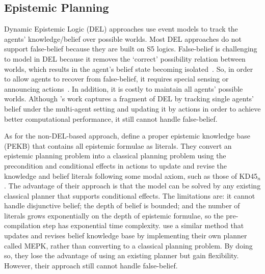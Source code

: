 \subsection{Epistemic Planning}


Dynamic Epistemic Logic (DEL)  approaches use event models to track the agents' knowledge/belief over possible worlds. 
Most DEL approaches do not support false-belief because they are built on S5 logics. 
False-belief is challenging to model in DEL because it removes the `correct' possibility relation between worlds, which results in the agent's belief state becoming isolated~\cite{DBLP:journals/ai/BaralGPS22}.
So, in order to allow agents to recover from false-belief, it requires special sensing or announcing actions~\cite{DBLP:conf/aips/LeFSP18,DBLP:journals/ai/BaralGPS22,DBLP:journals/jolli/LiE22}.
In addition, it is costly to maintain all agents' possible worlds.
Although \citet{DBLP:conf/aips/KominisG15}'s work captures a fragment of DEL by tracking single agents' belief under the multi-agent setting and updating it by actions in order to achieve better computational performance, it still cannot handle false-belief.

As for the non-DEL-based approach, \citet{DBLP:journals/ai/MuiseBFMMPS22} define a proper epistemic knowledge base (PEKB) that contains all epistemic formulae as literals.
They convert an epistemic planning problem into a classical planning problem using the precondition and conditional effects in actions to update and revise the knowledge and belief literals following some modal axiom, such as those of KD45$_n$.
The advantage of their approach is that the model can be solved by any existing classical planner that supports conditional effects.
The limitations are: it cannot handle disjunctive belief; the depth of belief is bounded; and the number of literals grows exponentially on the depth of epistemic formulae, so the pre-compilation step has exponential time complexity.
\cite{DBLP:journals/ai/WanFL21} use a similar method that updates and revises belief knowledge base by implementing their own planner called MEPK, rather than converting to a classical planning problem.
By doing so, they lose the advantage of using an existing planner but gain  flexibility.
However, their approach still cannot handle false-belief.

